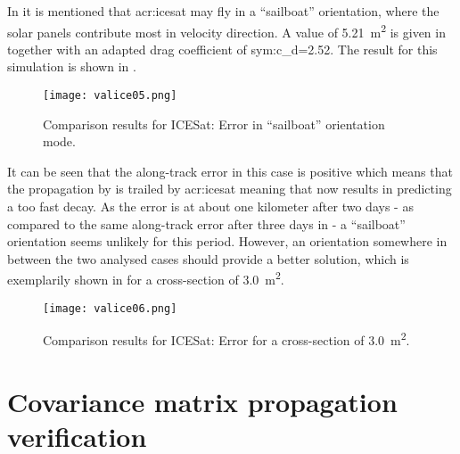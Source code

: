 In \cite{vallado2007} it is mentioned that \gls{acr:icesat} may fly in a ``sailboat'' orientation, where the solar panels contribute most in velocity direction. A value of \SI{5.21}{\metre\squared} is given in \cite{vallado2007} together with an 
adapted drag coefficient of \gls{sym:c_d}=\num{2.52}. The result for this simulation is shown in .
\begin{figure}[!h]
 \centering
 \texttt{[image: valice05.png]}
 \caption{Comparison results for ICESat: Error in ``sailboat'' orientation mode.\label{fig:val-ice-05}}
\end{figure}
It can be seen that the along-track error in this case is positive which means that the propagation by \neptune{} is trailed by \gls{acr:icesat} meaning that 
\neptune{} now results in predicting a too fast decay. As the error is at about one kilometer after two days - as compared to the same along-track error after 
three days in  - a ``sailboat'' orientation seems unlikely for this period. However, an orientation somewhere in between the two analysed 
cases should provide a better solution, which is exemplarily shown in  for a cross-section of \SI{3.0}{\metre\squared}.
\begin{figure}[!h]
 \centering
 \texttt{[image: valice06.png]}
 \caption{Comparison results for ICESat: Error for a cross-section of \SI{3.0}{\metre\squared}.\label{fig:val-ice-06}}
\end{figure}

\section{Covariance matrix propagation verification}

